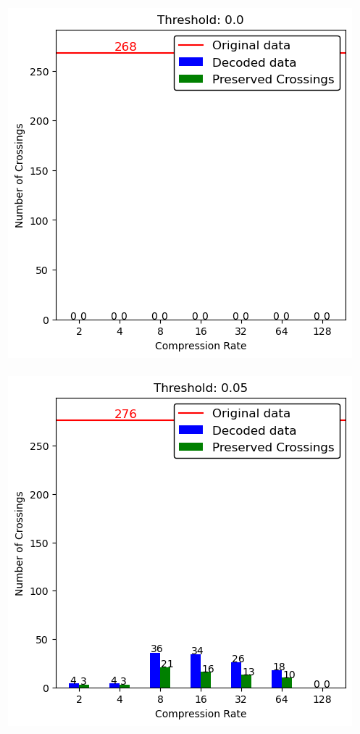 \begin{appendices}
	\begin{figure}[]
		\begin{subfigure}{.5\textwidth}
			\includegraphics[width=\textwidth]{../../Images/spikes_threshold_00.png}
		\end{subfigure}
		\begin{subfigure}{.5\textwidth}
			\includegraphics[width=\textwidth]{../../Images/spikes_threshold_005.png}

\end{subfigure}
\end{figure}
\end{appendices}
